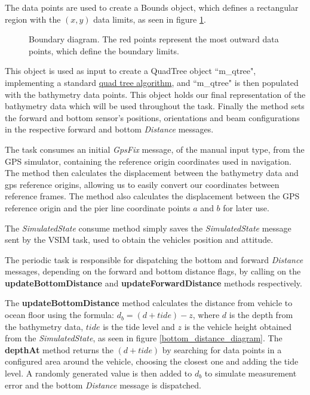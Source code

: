 \documentclass[10pt,a4paper]{article}
\begin{document}
The data points are used to create a Bounds object, which defines a rectangular region with the $\left(x,y\right)$ data limits, as seen in figure \ref{boundary_limits}.

\begin{figure}[h]
  \centering
  	
  \caption{Boundary diagram. The red points represent the most outward data points, which define the boundary limits.}
  \label{boundary_limits}
\end{figure}

This object is used as input to create a QuadTree object ``m\_qtree", implementing a standard \href{https://jimkang.com/quadtreevis/}{quad tree algorithm}, and ``m\_qtree" is then populated with the bathymetry data points. This object holds our final representation of the bathymetry data which will be used throughout the task. Finally the method sets the forward and bottom sensor's positions, orientations and beam configurations in the respective forward and bottom \textit{Distance} messages.

\par The task consumes an initial \textit{GpsFix} message, of the manual input type, from the GPS simulator, containing the reference origin coordinates used in navigation. The method then calculates the displacement between the bathymetry data and gps reference origins, allowing us to easily convert our coordinates between reference frames. The method also calculates the displacement between the GPS reference origin and the pier line coordinate points $a$ and $b$ for later use.

\par The \textit{SimulatedState} consume method simply saves the \textit{SimulatedState} message sent by the VSIM task, used to obtain the vehicles position and attitude.

\par The periodic task is responsible for dispatching the bottom and forward \textit{Distance} messages, depending on the forward and bottom distance flags, by calling on the \textbf{updateBottomDistance} and \textbf{updateForwardDistance} methods respectively.

\par The \textbf{updateBottomDistance} method calculates the distance from vehicle to ocean floor using the formula: $d_b = \left(d + tide\right) - z$, where $d$ is the depth from the bathymetry data, $tide$ is the tide level and $z$ is the vehicle height obtained from the \textit{SimulatedState}, as seen in figure \ref{bottom_distance_diagram}. The \textbf{depthAt} method returns the $\left(d + tide\right)$ by searching for data points in a configured area around the vehicle, choosing the closest one and adding the tide level. A randomly generated value is then added to $d_b$ to simulate measurement error and the bottom \textit{Distance} message is dispatched.
\end{document}
